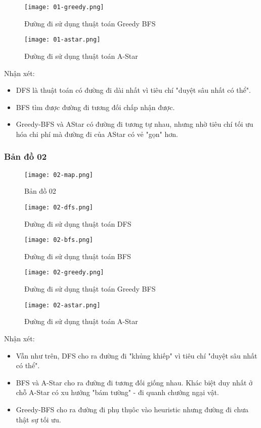 \documentclass{article}
\begin{document}
\begin{figure}[H]
\centering
\texttt{[image: 01-greedy.png]}
\caption{Đường đi sử dụng thuật toán Greedy BFS}
\end{figure}

\begin{figure}[H]
\centering
\texttt{[image: 01-astar.png]}
\caption{Đường đi sử dụng thuật toán A-Star}
\end{figure}


Nhận xét: 
\begin{itemize}
\item DFS là thuật toán có đường đi dài nhất vì tiêu chí "duyệt sâu nhất có thể".
\item BFS tìm được đường đi tương đối chấp nhận được.
\item Greedy-BFS và AStar có đường đi tương tự nhau, nhưng nhờ tiêu chí tối ưu hóa chi phí mà đường đi của AStar có vẻ "gọn" hơn.
\end{itemize}

\subsubsection{Bản đồ 02}
\begin{figure}[H]
	\centering
	\texttt{[image: 02-map.png]}
	\caption{Bản đồ 02}
\end{figure}

\begin{figure}[H]
	\centering
	\texttt{[image: 02-dfs.png]}
	\caption{Đường đi sử dụng thuật toán DFS}
\end{figure}

\begin{figure}[H]
	\centering
	\texttt{[image: 02-bfs.png]}
	\caption{Đường đi sử dụng thuật toán BFS}
\end{figure}

\begin{figure}[H]
	\centering
	\texttt{[image: 02-greedy.png]}
	\caption{Đường đi sử dụng thuật toán Greedy BFS}
\end{figure}

\begin{figure}[H]
	\centering
	\texttt{[image: 02-astar.png]}
	\caption{Đường đi sử dụng thuật toán A-Star}
\end{figure}

Nhận xét:
\begin{itemize}
\item Vẫn như trên, DFS cho ra đường đi "khủng khiếp" vì tiêu chí "duyệt sâu nhất có thể".
\item BFS và A-Star cho ra đường đi tương đối giống nhau. Khác biệt duy nhất ở chỗ A-Star có xu hướng "bám tường" - đi quanh chướng ngại vật.
\item Greedy-BFS cho ra đường đi phụ thụôc vào heuristic nhưng đường đi chưa thật sự tối ưu.
\end{itemize}
\end{document}
